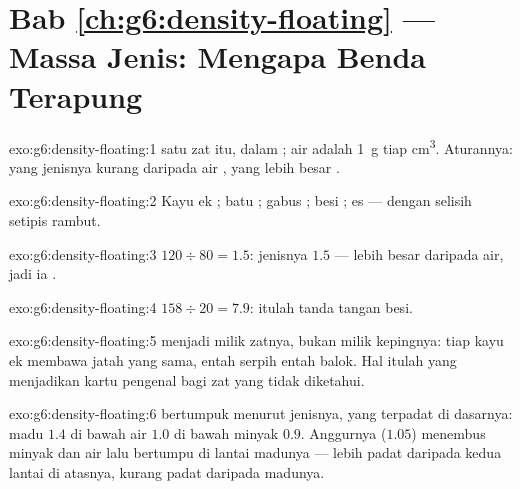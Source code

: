 \section*{Bab \ref{ch:g6:density-floating} --- Massa Jenis: Mengapa Benda Terapung}

\begin{solution}{exo:g6:density-floating:1}
 satu  zat itu, dalam ;  air
adalah \qty{1}{g} tiap \unit{cm^3}. Aturannya: yang  jenisnya
kurang daripada air , yang lebih besar .
\end{solution}

\begin{solution}{exo:g6:density-floating:2}
Kayu ek ; batu ; gabus ; besi ; es
 --- dengan selisih setipis rambut.
\end{solution}

\begin{solution}{exo:g6:density-floating:3}
$120 \div 80 = 1.5$:  jenisnya $1.5$ --- lebih besar daripada
air, jadi ia .
\end{solution}

\begin{solution}{exo:g6:density-floating:4}
$158 \div 20 = 7.9$: itulah tanda tangan besi.
\end{solution}

\begin{solution}{exo:g6:density-floating:5}
 menjadi milik zatnya, bukan milik kepingnya: tiap
 kayu ek membawa jatah  yang sama, entah serpih
entah balok. Hal itulah yang menjadikan  kartu pengenal
bagi zat yang tidak diketahui.
\end{solution}

\begin{solution}{exo:g6:density-floating:6}
 bertumpuk menurut  jenisnya, yang terpadat di dasarnya:
madu $1.4$ di bawah air $1.0$ di bawah minyak $0.9$. Anggurnya
($1.05$)  menembus minyak dan air lalu bertumpu di lantai
madunya --- lebih padat daripada kedua lantai di atasnya, kurang padat
daripada madunya.
\end{solution}

